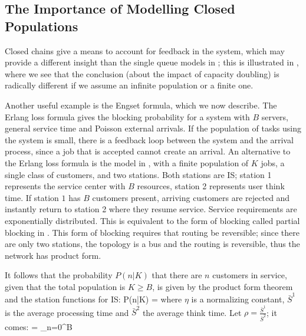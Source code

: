 \subsection{The Importance of Modelling Closed Populations}
\begin{figure}
  \label{fig-engset}
\end{figure}

Closed chains give a means to account for feedback in the
system, which may provide a different insight than the single
queue models in ; this is illustrated in
, where we see that the conclusion (about the
impact of capacity doubling) is radically different if we
assume an infinite population or a finite one.

Another useful example is the Engset formula, which we now
describe. The Erlang loss formula gives the blocking
probability for a system with $B$ servers, general service time
and Poisson external arrivals. If the population of tasks using
the system is small, there is a feedback loop between the
system and the arrival process, since a job that is accepted
cannot create an arrival. An alternative to the Erlang loss
formula is the model in , with a finite
population of $K$ jobs, a single class of customers, and two
stations. Both stations are IS; station 1 represents the
service center with $B$ resources, station 2 represents user
think time. If station $1$ has $B$ customers present, arriving
customers are rejected and instantly return to station 2 where
they resume service. Service requirements are exponentially
distributed. This is equivalent to the form of blocking called
partial blocking in . This form of
blocking requires that routing be reversible; since there are
only two stations, the topology is a bus and the routing is
reversible, thus the network has product form.

It follows that the probability $P(n|K)$ that
there are $n$ customers in service, given that
the total population is $K \geq B$, is given by
the product form theorem and the station
functions for IS:
 \be
 P(n|K) = 
 \ee
where $\eta$ is a normalizing constant,
$\bar{S}^1$ is the average processing time and
$\bar{S}^2$ the average think time. Let
$\rho=\frac{\bar{S}^1}{\bar{S}^2}$; it comes:
  \ben
  \eta  =  \sum_{n=0}^B 
  \een

